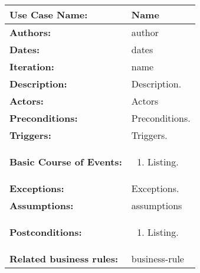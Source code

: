 \begin{tabularx}{\linewidth}{|l|X|}
\hline
\textbf{Use Case Name:} & \textbf{Name} \\
\hline
\textbf{Authors:} & author \\
\hline
\textbf{Dates:} & dates \\
\hline
\textbf{Iteration:} & name \\
\hline
\textbf{Description:} & Description. \\
\hline
\textbf{Actors:} & Actors \\
\hline
\textbf{Preconditions:} & Preconditions. \\
\hline
\textbf{Triggers:} & Triggers. \\
\hline
\textbf{Basic Course of Events:} & 
\begin{minipage}{\linewidth} 
  \vspace{0.05em}
  \begin{enumerate}
   \item Listing.
  \end{enumerate}
  \vspace{0.05em}
\end{minipage}
\\
\hline 
\textbf{Exceptions:} & Exceptions. \\
\hline
\textbf{Assumptions:} & assumptions \\
\hline
\textbf{Postconditions:} & 
  \begin{minipage}{\linewidth}
  \vspace{0.05em}
  \begin{enumerate}
    \item Listing.
  \end{enumerate}
  \vspace{0.05em}
\end{minipage}
\\
\hline
\textbf{Related business rules:} & business-rule \\
\hline
\end{tabularx}


